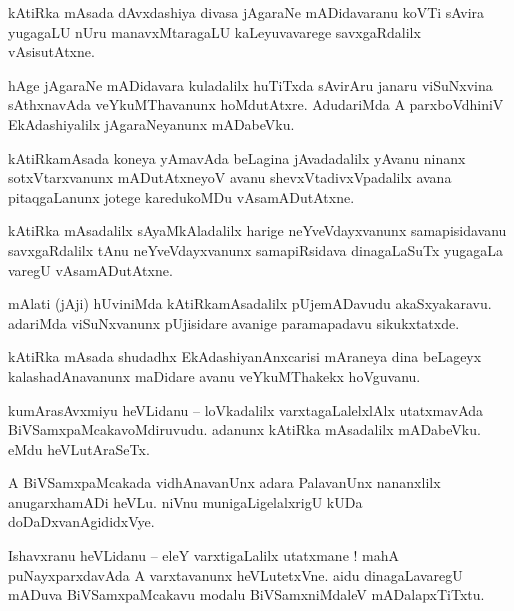 \documentclass{article}
\begin{document}
\begin{mn}%
kAtiRka mAsada dAvxdashiya divasa jAgaraNe mADidavaranu koVTi sAvira yugagaLU nUru manavxMtaragaLU 
kaLeyuvavarege savxgaRdalilx vAsisutAtxne.
\end{mn}

\begin{mn}%
hAge jAgaraNe mADidavara kuladalilx huTiTxda sAvirAru janaru viSuNxvina sAthxnavAda 
veYkuMThavanunx hoMdutAtxre. AdudariMda A parxboVdhiniV EkAdashiyalilx jAgaraNeyanunx mADabeVku.
\end{mn}

\begin{mn}%
kAtiRkamAsada koneya yAmavAda beLagina jAvadadalilx yAvanu ninanx sotxVtarxvanunx mADutAtxneyoV 
avanu shevxVtadivxVpadalilx avana pitaqgaLanunx jotege karedukoMDu vAsamADutAtxne.
\end{mn}

\begin{mn}%
kAtiRka mAsadalilx sAyaMkAladalilx harige neYveVdayxvanunx samapisidavanu savxgaRdalilx tAnu 
neYveVdayxvanunx samapiRsidava dinagaLaSuTx yugagaLa varegU vAsamADutAtxne.
\end{mn}

\begin{mn}%
mAlati (jAji) hUviniMda kAtiRkamAsadalilx pUjemADavudu akaSxyakaravu. adariMda viSuNxvanunx 
pUjisidare avanige paramapadavu sikukxtatxde.
\end{mn}

\begin{mn}%
kAtiRka mAsada shudadhx EkAdashiyanAnxcarisi mAraneya dina beLageyx kalashadAnavanunx maDidare 
avanu veYkuMThakekx hoVguvanu.
\end{mn}

\begin{mn}%
kumArasAvxmiyu heVLidanu -- loVkadalilx varxtagaLalelxlAlx utatxmavAda BiVSamxpaMcakavoMdiruvudu. 
adanunx kAtiRka mAsadalilx mADabeVku. eMdu heVLutAraSeTx.
\end{mn}

\begin{mn}%
A BiVSamxpaMcakada vidhAnavanUnx adara PalavanUnx nananxlilx anugarxhamADi heVLu. niVnu 
munigaLigelalxrigU kUDa doDaDxvanAgididxVye.
\end{mn}

\begin{mn}%
Ishavxranu heVLidanu -- eleY varxtigaLalilx utatxmane ! mahA puNayxparxdavAda A varxtavanunx 
heVLutetxVne. aidu dinagaLavaregU mADuva BiVSamxpaMcakavu modalu BiVSamxniMdaleV mADalapxTiTxtu.
\end{mn}
\end{document}
